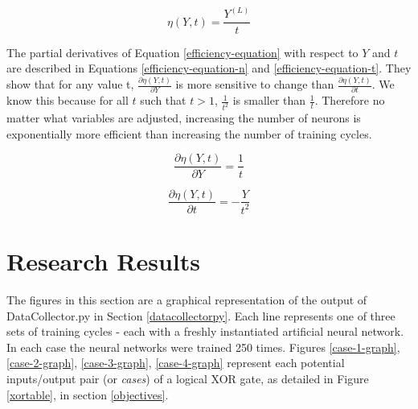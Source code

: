 \documentclass[12pt]{article}
\begin{document}
\begin{equation} \label{efficiency-equation}
    \eta(Y, t) =  \frac{Y^{(L)}}{t}
\end{equation}

The partial derivatives of Equation \ref{efficiency-equation} with respect to $Y$ and $t$ are described in Equations \ref{efficiency-equation-n} and \ref{efficiency-equation-t}. They show that for any value t, $\frac{\partial \eta(Y, t)}{\partial Y}$ is more sensitive to change than $\frac{\partial \eta(Y, t)}{\partial t}$. We know this because for all $t$ such that $t > 1$, $\frac{1}{t^2}$ is smaller than $\frac{1}{t}$. Therefore no matter what variables are adjusted, increasing the number of neurons is exponentially more efficient than increasing the number of training cycles.

\begin{equation} \label{efficiency-equation-n}
    \frac{\partial \eta(Y, t)}{\partial Y} = \frac{1}{t}
\end{equation}

\begin{equation} \label{efficiency-equation-t}
    \frac{\partial \eta(Y, t)}{\partial t} = -\frac{Y}{t^2}
\end{equation}

\section{Research Results \label{results}}

The figures in this section are a graphical representation of the output of DataCollector.py in Section \ref{datacollectorpy}. Each line represents one of three sets of training cycles - each with a freshly instantiated artificial neural network. In each case the neural networks were trained 250 times. Figures \ref{case-1-graph}, \ref{case-2-graph}, \ref{case-3-graph}, \ref{case-4-graph} represent each potential inputs/output pair (or \textit{cases}) of a logical XOR gate, as detailed in Figure \ref{xortable}, in section \ref{objectives}.
\end{document}
